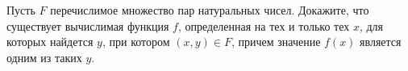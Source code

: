 Пусть $F$ перечислимое множество пар натуральных чисел. Докажите, что существует вычислимая функция $f$,
определенная на тех и только тех $x$, для которых найдется $y$, при котором $(x, y) \in F$, причем
значение $f(x)$ является одним из таких $y$.
